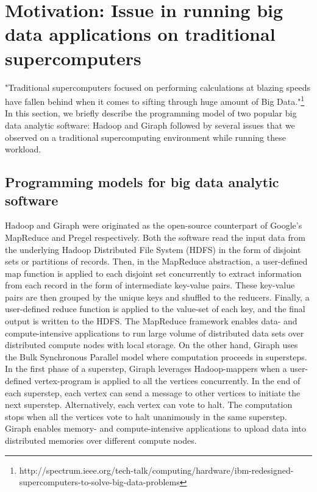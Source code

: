 \documentclass[conference]{IEEEtran}
\begin{document}
\section {Motivation: Issue in running big data applications on traditional supercomputers} \label{Bigdata Softwares on Traditional Supercomputers}
"Traditional supercomputers focused on performing calculations at blazing speeds have fallen behind when it comes to sifting through huge amount of Big Data."\footnote{http://spectrum.ieee.org/tech-talk/computing/hardware/ibm-redesigned-supercomputers-to-solve-big-data-problems}\\
In this section, we briefly describe the programming model of two popular big data analytic software: Hadoop and Giraph followed by several issues that we observed on a traditional supercomputing environment while running these workload. 
\subsection {Programming models for big data analytic software}
Hadoop and Giraph were originated as the open-source counterpart of Google's MapReduce \cite{fw:mapreduce} and Pregel \cite{fw:pregel} respectively. 
Both the software read the input data  from the underlying Hadoop Distributed File System (HDFS) in the form of disjoint sets or partitions of records. 
Then, in the MapReduce abstraction, a user-defined map function is applied to each disjoint set concurrently to extract information from each record in the form of intermediate key-value pairs. 
These key-value pairs are then grouped by the unique keys and shuffled to the reducers. 
Finally, a user-defined reduce function is applied to the value-set of each key, and the final output is written to the HDFS. 
The MapReduce framework enables data- and compute-intensive applications to run large volume of distributed data sets over distributed compute nodes with local storage.
On the other hand, Giraph uses the Bulk Synchronous Parallel model \cite{fw:bsp} where computation proceeds in supersteps. 
In the first phase of a superstep, Giraph leverages Hadoop-mappers when a user-defined vertex-program is applied to all the vertices concurrently.
In the end of each superstep, each vertex can send a message to other vertices to initiate the next superstep. 
Alternatively, each vertex can vote to halt. 
The computation stops when all the vertices vote to halt unanimously in the same superstep. 
Giraph enables memory- and compute-intensive applications to upload data into distributed memories over different compute nodes.
\end{document}
